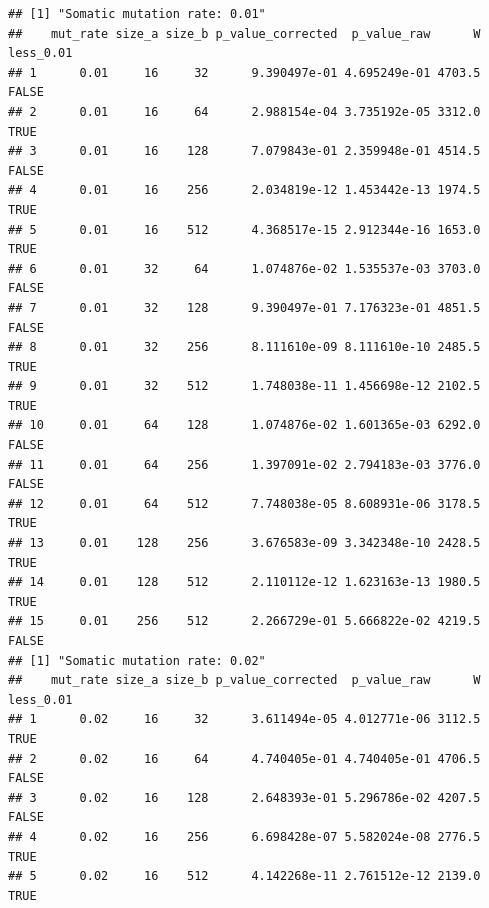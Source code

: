 \documentclass[]{book}
\newenvironment{Shaded}{\begin{snugshade}}{\end{snugshade}}
\newcommand{\DataTypeTok}[1]{\textcolor[rgb]{0.13,0.29,0.53}{#1}}
\newcommand{\FloatTok}[1]{\textcolor[rgb]{0.00,0.00,0.81}{#1}}
\newcommand{\KeywordTok}[1]{\textcolor[rgb]{0.13,0.29,0.53}{\textbf{#1}}}
\newcommand{\NormalTok}[1]{#1}
\newcommand{\OperatorTok}[1]{\textcolor[rgb]{0.81,0.36,0.00}{\textbf{#1}}}
\newcommand{\StringTok}[1]{\textcolor[rgb]{0.31,0.60,0.02}{#1}}
\begin{document}
\begin{Shaded}
\end{Shaded}

\begin{verbatim}
## [1] "Somatic mutation rate: 0.01"
##    mut_rate size_a size_b p_value_corrected  p_value_raw      W less_0.01
## 1      0.01     16     32      9.390497e-01 4.695249e-01 4703.5     FALSE
## 2      0.01     16     64      2.988154e-04 3.735192e-05 3312.0      TRUE
## 3      0.01     16    128      7.079843e-01 2.359948e-01 4514.5     FALSE
## 4      0.01     16    256      2.034819e-12 1.453442e-13 1974.5      TRUE
## 5      0.01     16    512      4.368517e-15 2.912344e-16 1653.0      TRUE
## 6      0.01     32     64      1.074876e-02 1.535537e-03 3703.0     FALSE
## 7      0.01     32    128      9.390497e-01 7.176323e-01 4851.5     FALSE
## 8      0.01     32    256      8.111610e-09 8.111610e-10 2485.5      TRUE
## 9      0.01     32    512      1.748038e-11 1.456698e-12 2102.5      TRUE
## 10     0.01     64    128      1.074876e-02 1.601365e-03 6292.0     FALSE
## 11     0.01     64    256      1.397091e-02 2.794183e-03 3776.0     FALSE
## 12     0.01     64    512      7.748038e-05 8.608931e-06 3178.5      TRUE
## 13     0.01    128    256      3.676583e-09 3.342348e-10 2428.5      TRUE
## 14     0.01    128    512      2.110112e-12 1.623163e-13 1980.5      TRUE
## 15     0.01    256    512      2.266729e-01 5.666822e-02 4219.5     FALSE
## [1] "Somatic mutation rate: 0.02"
##    mut_rate size_a size_b p_value_corrected  p_value_raw      W less_0.01
## 1      0.02     16     32      3.611494e-05 4.012771e-06 3112.5      TRUE
## 2      0.02     16     64      4.740405e-01 4.740405e-01 4706.5     FALSE
## 3      0.02     16    128      2.648393e-01 5.296786e-02 4207.5     FALSE
## 4      0.02     16    256      6.698428e-07 5.582024e-08 2776.5      TRUE
## 5      0.02     16    512      4.142268e-11 2.761512e-12 2139.0      TRUE

\end{verbatim}
\end{document}

